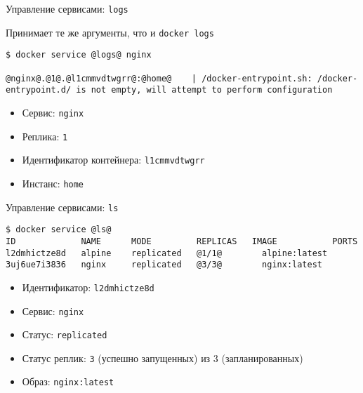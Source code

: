 \begin{frame}[fragile]{Управление сервисами: \texttt{logs} }

Принимает те же аргументы, что и \texttt{docker logs}

\begin{tcolorbox-code}
\begin{lstlisting}[style=base]
$ docker service @logs@ nginx

@nginx@.@1@.@l1cmmvdtwgrr@:@home@    | /docker-entrypoint.sh: /docker-entrypoint.d/ is not empty, will attempt to perform configuration
\end{lstlisting}
\end{tcolorbox-code}

\begin{itemize}
    \item Сервис: \texttt{nginx}
    \item Реплика: \texttt{1}
    \item Идентификатор контейнера: \texttt{l1cmmvdtwgrr}
    \item Инстанс: \texttt{home}
\end{itemize}

\end{frame}

\begin{frame}[fragile]{Управление сервисами: \texttt{ls} }

\begin{tcolorbox-code}
\begin{lstlisting}[style=base]
$ docker service @ls@
ID             NAME      MODE         REPLICAS   IMAGE           PORTS
l2dmhictze8d   alpine    replicated   @1/1@        alpine:latest   
3uj6ue7i3836   nginx     replicated   @3/3@        nginx:latest
\end{lstlisting}
\end{tcolorbox-code}

\begin{itemize}
    \item Идентификатор: \texttt{l2dmhictze8d}
    \item Сервис: \texttt{nginx}
    \item Статус: \texttt{replicated}
    \item Статус реплик: \texttt{3} (успешно запущенных) из 3 (запланированных)
    \item Образ: \texttt{nginx:latest}
\end{itemize}

\end{frame}

